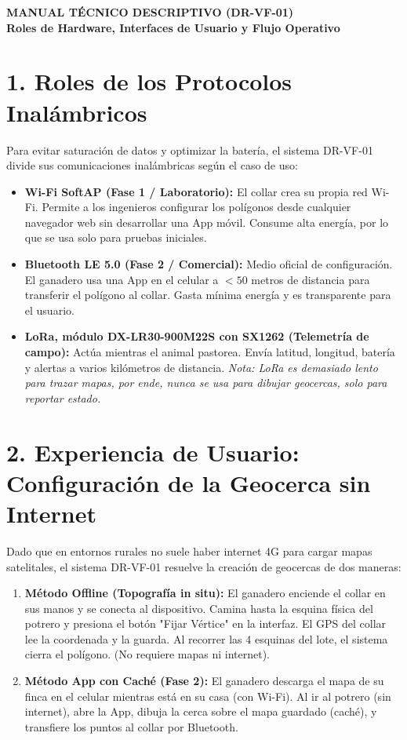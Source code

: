\documentclass[10pt,letterpaper]{article}
\begin{document}
\begin{center}
    {\Large \textbf{MANUAL TÉCNICO DESCRIPTIVO (DR-VF-01)}}\\[0.2cm]
    {\normalsize \textbf{Roles de Hardware, Interfaces de Usuario y Flujo Operativo}}
\end{center}
\vspace{0.3cm}

\section*{1. Roles de los Protocolos Inalámbricos}
Para evitar saturación de datos y optimizar la batería, el sistema DR-VF-01 divide sus comunicaciones inalámbricas según el caso de uso:
\begin{itemize}[leftmargin=*]
    \item \textbf{Wi-Fi SoftAP (Fase 1 / Laboratorio):} El collar crea su propia red Wi-Fi. Permite a los ingenieros configurar los polígonos desde cualquier navegador web sin desarrollar una App móvil. Consume alta energía, por lo que se usa solo para pruebas iniciales.
    \item \textbf{Bluetooth LE 5.0 (Fase 2 / Comercial):} Medio oficial de configuración. El ganadero usa una App en el celular a $<50$ metros de distancia para transferir el polígono al collar. Gasta mínima energía y es transparente para el usuario.
    \item \textbf{LoRa, módulo DX-LR30-900M22S con SX1262 (Telemetría de campo):} Actúa mientras el animal pastorea. Envía latitud, longitud, batería y alertas a varios kilómetros de distancia. \emph{Nota: LoRa es demasiado lento para trazar mapas, por ende, nunca se usa para dibujar geocercas, solo para reportar estado.}
\end{itemize}

\section*{2. Experiencia de Usuario: Configuración de la Geocerca sin Internet}
Dado que en entornos rurales no suele haber internet 4G para cargar mapas satelitales, el sistema DR-VF-01 resuelve la creación de geocercas de dos maneras:
\begin{enumerate}[leftmargin=*]
    \item \textbf{Método Offline (Topografía in situ):} El ganadero enciende el collar en sus manos y se conecta al dispositivo. Camina hasta la esquina física del potrero y presiona el botón "Fijar Vértice" en la interfaz. El GPS del collar lee la coordenada y la guarda. Al recorrer las 4 esquinas del lote, el sistema cierra el polígono. (No requiere mapas ni internet).
    \item \textbf{Método App con Caché (Fase 2):} El ganadero descarga el mapa de su finca en el celular mientras está en su casa (con Wi-Fi). Al ir al potrero (sin internet), abre la App, dibuja la cerca sobre el mapa guardado (caché), y transfiere los puntos al collar por Bluetooth.
\end{enumerate}
\end{document}
